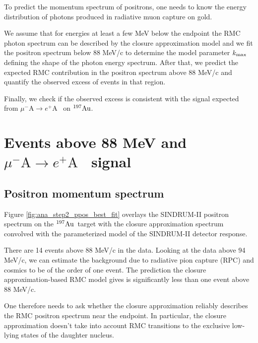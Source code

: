 \documentclass[12pt]{article}
\newcommand {\mumepconv}[1][A] {%
  \def\ArgI{{#1}}%
  \mumepconvRelay
}
\newcommand \mumepconvRelay[1][A]  {\mbox{$\mu^- \textrm{\ArgI} \rightarrow e^+ \textrm{#1}$}}
\newcommand {\Au}[1]     {\mbox{$\rm ^{#1}Au$}}                 %
\newcommand {\kmax}      {\mbox{$k_{\rm max}$}}
\begin{document}
To predict the momentum spectrum of positrons, one needs to know the
energy distribution of photons produced in radiative muon capture on gold.   

We assume that for energies at least a few MeV below the endpoint the RMC photon
spectrum can be described by the closure approximation model and we fit the
positron spectrum below 88 MeV/c to determine the model parameter $\kmax$ defining
the shape of the photon energy spectrum. After that, we predict the expected 
RMC contribution in the positron spectrum above 88 MeV/c and quantify the observed
excess of events in that region.

Finally, we check if the observed excess is consistent with the signal expected from
\mumepconv\ on \Au{197}.










\newpage
\section {Events above 88 MeV and \mumepconv\ signal}
\subsection {Positron momentum spectrum}

Figure \ref{fig:ana_step2_ppos_best_fit} overlays the SINDRUM-II positron spectrum
on the \Au{197}\ target with the closure approximation spectrum convolved with the 
parameterized model of the SINDRUM-II detector response.

There are 14 events above 88 MeV/c in the data. Looking at the data above 94 MeV/c,
we can estimate the background due to radiative pion capture (RPC) and cosmics to be
of the order of one event. The prediction the closure approximation-based RMC model
gives is significantly less than one event above 88 MeV/c. 

One therefore needs to ask whether the closure approximation reliably describes
the RMC positron spectrum near the endpoint. In particular, the closure approximation
doesn't take into account RMC transitions to the exclusive low-lying states of the 
daughter nucleus.
\end{document}
